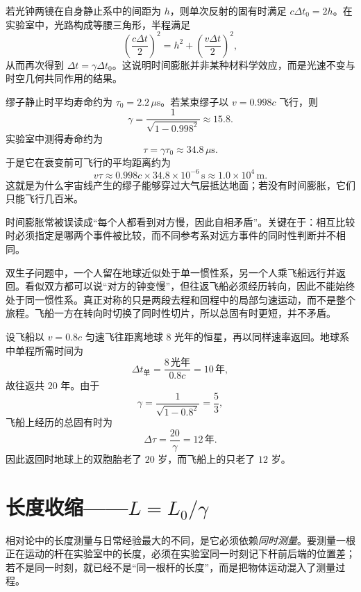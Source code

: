 若光钟两镜在自身静止系中的间距为 $h$，则单次反射的固有时满足 $c\Delta t_0=2h$。在实验室中，光路构成等腰三角形，半程满足
\[
\left(\frac{c\Delta t}{2}\right)^2=h^2+\left(\frac{v\Delta t}{2}\right)^2,
\]
从而再次得到 $\Delta t=\gamma\Delta t_0$。这说明时间膨胀并非某种材料学效应，而是光速不变与时空几何共同作用的结果。

\begin{example}[高空缪子的寿命]
缪子静止时平均寿命约为 $\tau_0=2.2\,\mu\mathrm{s}$。若某束缪子以 $v=0.998c$ 飞行，则
\[
\gamma=\frac{1}{\sqrt{1-0.998^2}}\approx 15.8.
\]
实验室中测得寿命约为
\[
\tau=\gamma\tau_0\approx 34.8\,\mu\mathrm{s}.
\]
于是它在衰变前可飞行的平均距离约为
\[
v\tau\approx 0.998c\times 34.8\times 10^{-6}\,\mathrm{s}\approx 1.0\times 10^4\,\mathrm{m}.
\]
这就是为什么宇宙线产生的缪子能够穿过大气层抵达地面；若没有时间膨胀，它们只能飞行几百米。
\end{example}

时间膨胀常被误读成“每个人都看到对方慢，因此自相矛盾”。关键在于：相互比较时必须指定是哪两个事件被比较，而不同参考系对远方事件的同时性判断并不相同。

\begin{remark}[双生子佯谬的实质]
双生子问题中，一个人留在地球近似处于单一惯性系，另一个人乘飞船远行并返回。看似双方都可以说“对方的钟变慢”，但往返飞船必须经历转向，因此不能始终处于同一惯性系。真正对称的只是两段去程和回程中的局部匀速运动，而不是整个旅程。飞船一方在转向时切换了同时性切片，所以总固有时更短，并不矛盾。
\end{remark}

\begin{example}[双生子计算]
设飞船以 $v=0.8c$ 匀速飞往距离地球 $8$ 光年的恒星，再以同样速率返回。地球系中单程所需时间为
\[
\Delta t_{\text{单}}=\frac{8\,\text{光年}}{0.8c}=10\,\text{年},
\]
故往返共 $20$ 年。由于
\[
\gamma=\frac{1}{\sqrt{1-0.8^2}}=\frac{5}{3},
\]
飞船上经历的总固有时为
\[
\Delta \tau=\frac{20}{\gamma}=12\,\text{年}.
\]
因此返回时地球上的双胞胎老了 $20$ 岁，而飞船上的只老了 $12$ 岁。
\end{example}

\section{长度收缩——$L=L_0/\gamma$}

相对论中的长度测量与日常经验最大的不同，是它必须依赖\emph{同时测量}。要测量一根正在运动的杆在实验室中的长度，必须在实验室同一时刻记下杆前后端的位置差；若不是同一时刻，就已经不是“同一根杆的长度”，而是把物体运动混入了测量过程。

